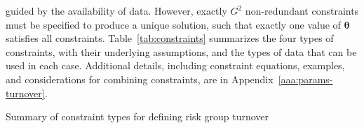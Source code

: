 guided by the availability of data.
However, exactly $G^2$ non-redundant constraints must be specified
to produce a unique solution,
such that exactly one value of $\bm{\theta}$ satisfies all constraints.
Table~\ref{tab:constraints} summarizes
the four types of constraints,
with their underlying assumptions,
and the types of data that can be used in each case.
Additional details, including
constraint equations, examples, and considerations for combining constraints,
are in Appendix~\ref{aaa:params-turnover}.
\begin{table}
  \centering
  \caption{Summary of constraint types for defining risk group turnover}
  \label{tab:constraints}
  
\end{table}
